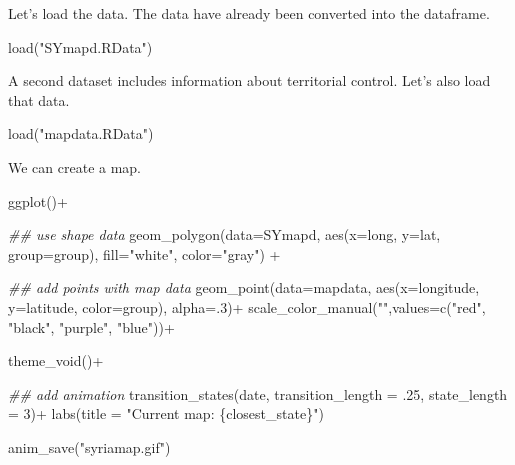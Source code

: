 \documentclass[
  letterpaper,
  DIV=11,
  numbers=noendperiod]{scrreprt}
\newenvironment{Shaded}{\begin{snugshade}}{\end{snugshade}}
\newcommand{\AttributeTok}[1]{\textcolor[rgb]{0.40,0.45,0.13}{#1}}
\newcommand{\DecValTok}[1]{\textcolor[rgb]{0.68,0.00,0.00}{#1}}
\newcommand{\DocumentationTok}[1]{\textcolor[rgb]{0.37,0.37,0.37}{\textit{#1}}}
\newcommand{\FunctionTok}[1]{\textcolor[rgb]{0.28,0.35,0.67}{#1}}
\newcommand{\NormalTok}[1]{\textcolor[rgb]{0.00,0.23,0.31}{#1}}
\newcommand{\SpecialCharTok}[1]{\textcolor[rgb]{0.37,0.37,0.37}{#1}}
\newcommand{\StringTok}[1]{\textcolor[rgb]{0.13,0.47,0.30}{#1}}
\begin{document}
Let's load the data. The data have already been converted into the
dataframe.

\begin{Shaded}
\begin{Highlighting}[]
\FunctionTok{load}\NormalTok{(}\StringTok{"SYmapd.RData"}\NormalTok{)}
\end{Highlighting}
\end{Shaded}

A second dataset includes information about territorial control. Let's
also load that data.

\begin{Shaded}
\begin{Highlighting}[]
\FunctionTok{load}\NormalTok{(}\StringTok{"mapdata.RData"}\NormalTok{)}
\end{Highlighting}
\end{Shaded}

We can create a map.

\begin{Shaded}
\begin{Highlighting}[]
\FunctionTok{ggplot}\NormalTok{()}\SpecialCharTok{+}
  
  \DocumentationTok{\#\# use shape data}
   \FunctionTok{geom\_polygon}\NormalTok{(}\AttributeTok{data=}\NormalTok{SYmapd, }\FunctionTok{aes}\NormalTok{(}\AttributeTok{x=}\NormalTok{long, }\AttributeTok{y=}\NormalTok{lat, }\AttributeTok{group=}\NormalTok{group),}
                \AttributeTok{fill=}\StringTok{"white"}\NormalTok{, }\AttributeTok{color=}\StringTok{"gray"}\NormalTok{) }\SpecialCharTok{+}  
  
  \DocumentationTok{\#\# add points with map data}
   \FunctionTok{geom\_point}\NormalTok{(}\AttributeTok{data=}\NormalTok{mapdata, }\FunctionTok{aes}\NormalTok{(}\AttributeTok{x=}\NormalTok{longitude, }\AttributeTok{y=}\NormalTok{latitude, }\AttributeTok{color=}\NormalTok{group), }\AttributeTok{alpha=}\NormalTok{.}\DecValTok{3}\NormalTok{)}\SpecialCharTok{+}
   \FunctionTok{scale\_color\_manual}\NormalTok{(}\StringTok{""}\NormalTok{,}\AttributeTok{values=}\FunctionTok{c}\NormalTok{(}\StringTok{"red"}\NormalTok{, }\StringTok{"black"}\NormalTok{, }\StringTok{"purple"}\NormalTok{, }\StringTok{"blue"}\NormalTok{))}\SpecialCharTok{+}
  
  
   \FunctionTok{theme\_void}\NormalTok{()}\SpecialCharTok{+} 
  
  \DocumentationTok{\#\# add animation}
   \FunctionTok{transition\_states}\NormalTok{(date, }\AttributeTok{transition\_length =}\NormalTok{ .}\DecValTok{25}\NormalTok{, }\AttributeTok{state\_length =} \DecValTok{3}\NormalTok{)}\SpecialCharTok{+}
   \FunctionTok{labs}\NormalTok{(}\AttributeTok{title =} \StringTok{"Current map: \{closest\_state\}"}\NormalTok{)}

\FunctionTok{anim\_save}\NormalTok{(}\StringTok{"syriamap.gif"}\NormalTok{)}
\end{Highlighting}
\end{Shaded}
\end{document}
